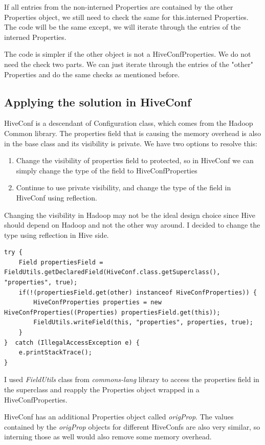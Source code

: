 If all entries from the non-interned Properties are contained by the other Properties object, we still need to check the same for this.interned Properties. The code will be the same except, we will iterate through the entries of the interned Properties. 

The code is simpler if the other object is not a HiveConfProperties. We do not need the check two parts. We can just iterate through the entries of the "other" Properties and do the same checks as mentioned before.

\subsection{Applying the solution in HiveConf}
HiveConf is a descendant of Configuration class, which comes from the Hadoop Common library. The properties field that is causing the memory overhead is also in the base class and its visibility is private. We have two options to resolve this:
\begin{enumerate}
	\item Change the visibility of properties field to protected, so in HiveConf we can simply change the type of the field to HiveConfProperties
	\item Continue to use private visibility, and change the type of the field in HiveConf using reflection.
\end{enumerate}

Changing the visibility in Hadoop may not be the ideal design choice since Hive should depend on Hadoop and not the other way around. I decided to change the type using reflection in Hive side. 

\begin{lstlisting}
try {
	Field propertiesField = FieldUtils.getDeclaredField(HiveConf.class.getSuperclass(), "properties", true);
	if(!(propertiesField.get(other) instanceof HiveConfProperties)) {
		HiveConfProperties properties = new HiveConfProperties((Properties) propertiesField.get(this));
		FieldUtils.writeField(this, "properties", properties, true);
	}
}  catch (IllegalAccessException e) {
	e.printStackTrace();
}
\end{lstlisting}

I used \textit{FieldUtils} class from \textit{commons-lang} library to access the properties field in the superclass and reapply the Properties object wrapped in a HiveConfProperties.

HiveConf has an additional Properties object called \textit{origProp}. The values contained by the \textit{origProp} objects for different HiveConfs are also very similar, so interning those as well would also remove some memory overhead. 

